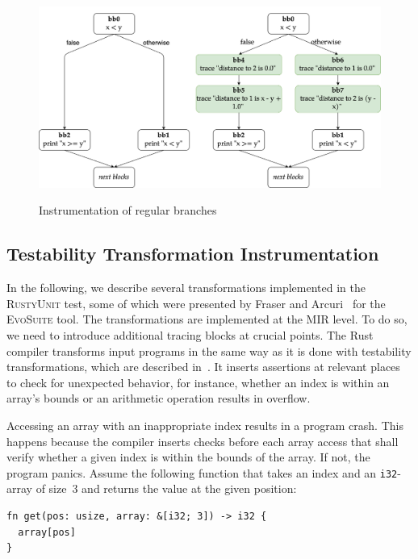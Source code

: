 \documentclass[paper=a4,%
  twoside,%
  BCOR4mm,%
  abstract=true,%
  toc=bibliography,%
  chapterprefix=true,%
  toc=bibliographynumbered,%
  open=right,%
  english,%
  pagesize=pdftex]{scrreprt}
\newcommand{\tech}{\textsc{RustyUnit}\xspace}
\newcommand{\mir}{\ac{MIR}\xspace}
\begin{document}
\begin{figure}[h]
\caption{Instrumentation of regular branches}
\centering
\includegraphics[width=\textwidth]{comparison-instrumented-branch-cfg}
\label{fig:comparison-instrumented-branch-cfg}
\end{figure}

\subsection{Testability Transformation Instrumentation}
\label{sec:mir-testability-transformations}
In the following, we describe several transformations implemented in the \tech test, some of which were presented by Fraser and Arcuri~\cite{Fraser2013} for the \textsc{EvoSuite} tool. The transformations are implemented at the \mir level. To do so, we need to introduce additional tracing blocks at crucial points. The Rust compiler transforms input programs in the same way as it is done with testability transformations, which are described in~. It inserts assertions at relevant places to check for unexpected behavior, for instance, whether an index is within an array's bounds or an arithmetic operation results in overflow.

Accessing an array with an inappropriate index results in a program crash. This happens because the compiler inserts checks before each array access that shall verify whether a given index is within the bounds of the array. If not, the program panics. Assume the following function that takes an index and an \texttt{i32}-array of size~$3$ and returns the value at the given position:
\begin{lstlisting}[style=boxed, caption={}, label=lst:array-index-access-example]
fn get(pos: usize, array: &[i32; 3]) -> i32 {
  array[pos]
}
\end{lstlisting}
\end{document}
